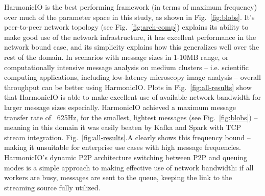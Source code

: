 \documentclass[conference]{IEEEtran}
\begin{document}

HarmonicIO is the best performing framework (in terms of maximum frequency) over much of the parameter space in this study, as shown in Fig.~\ref{fig:blobs}. 
It's peer-to-peer network topology (see Fig.~\ref{fig:arch-comp}) explains its ability to make good use of the network infrastructure, it has excellent performance in the network bound case, and its simplicity explains how this generalizes well over the rest of the domain. In scenarios with message sizes in 1-10MB range, or computationally intensive message analysis on medium clusters -- i.e. scientific computing applications, including low-latency microscopy image analysis -- overall throughput can be better using HarmonicIO. Plots in Fig.~\ref{fig:all-results} show that HarmonicIO is able to make excellent use of available network bandwidth for larger message sizes especially.
HarmonicIO achieved a maximum message transfer rate of ~625Hz, for the smallest, lightest messages (see Fig.~\ref{fig:blobs}) -- meaning in this domain it was easily beaten by Kafka and Spark with TCP stream integration. Fig.~\ref{fig:all-results}.A clearly shows this frequency bound -- making it unsuitable for enterprise use cases with high message frequencies.
HarmonicIO's dynamic P2P architecture switching between P2P and queuing modes is a simple approach to making effective use of network bandwidth: if all workers are busy, messages are sent to the queue, keeping the link to the streaming source fully utilized. 



\end{document}
